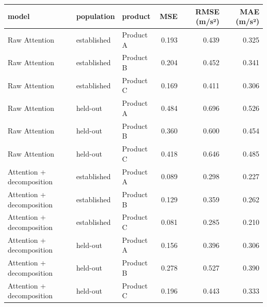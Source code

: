 \begin{tabular}{lllrrr}
\toprule
model & population & product & MSE & RMSE (m/s²) & MAE (m/s²) \\
\midrule
Raw Attention & established & Product A & 0.193 & 0.439 & 0.325 \\
Raw Attention & established & Product B & 0.204 & 0.452 & 0.341 \\
Raw Attention & established & Product C & 0.169 & 0.411 & 0.306 \\
Raw Attention & held-out & Product A & 0.484 & 0.696 & 0.526 \\
Raw Attention & held-out & Product B & 0.360 & 0.600 & 0.454 \\
Raw Attention & held-out & Product C & 0.418 & 0.646 & 0.485 \\
Attention + decomposition & established & Product A & 0.089 & 0.298 & 0.227 \\
Attention + decomposition & established & Product B & 0.129 & 0.359 & 0.262 \\
Attention + decomposition & established & Product C & 0.081 & 0.285 & 0.210 \\
Attention + decomposition & held-out & Product A & 0.156 & 0.396 & 0.306 \\
Attention + decomposition & held-out & Product B & 0.278 & 0.527 & 0.390 \\
Attention + decomposition & held-out & Product C & 0.196 & 0.443 & 0.333 \\
\bottomrule
\end{tabular}
